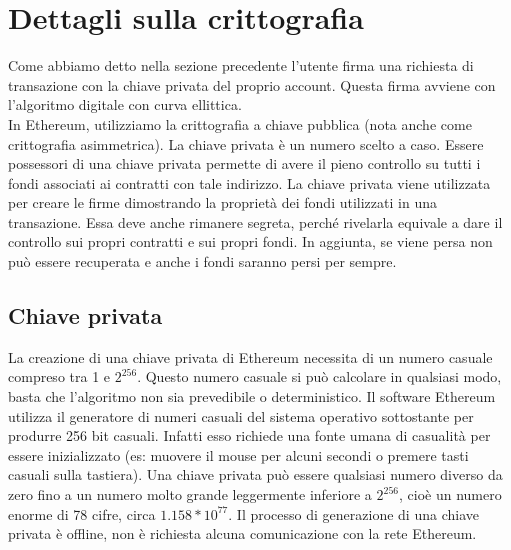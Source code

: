 \documentclass[a4paper,11pt]{report}
\begin{document}
\section{Dettagli sulla crittografia}
Come abbiamo detto nella sezione precedente l'utente firma una richiesta di transazione con la chiave privata del proprio account. Questa firma avviene con l'algoritmo digitale con curva ellittica.\\
In Ethereum, utilizziamo la crittografia a chiave pubblica (nota anche come crittografia asimmetrica).
La chiave privata è un numero scelto a caso. Essere possessori di una chiave privata permette di avere il pieno controllo su tutti i fondi associati ai contratti con tale indirizzo. 
La chiave privata viene utilizzata per creare le firme dimostrando la proprietà dei fondi utilizzati in una transazione. Essa deve anche rimanere segreta, perché rivelarla equivale a dare il controllo sui propri contratti e sui propri fondi. In aggiunta, se viene persa non può essere recuperata e anche i fondi saranno persi per sempre.\\

\subsection{Chiave privata}
La creazione di una chiave privata di Ethereum necessita di un numero casuale compreso tra 1 e $2^{256}$. Questo numero casuale si può calcolare in qualsiasi modo, basta che l'algoritmo non sia prevedibile o deterministico. Il software Ethereum utilizza il generatore di numeri casuali del sistema operativo sottostante per produrre 256 bit casuali. Infatti esso richiede una fonte umana di casualità per essere inizializzato (es: muovere il mouse per alcuni secondi o premere tasti casuali sulla tastiera).
Una chiave privata può essere qualsiasi numero diverso da zero fino a un numero molto grande leggermente inferiore a $2^{256}$, cioè un numero enorme di 78 cifre, circa $1.158*10^{77}$.
Il processo di generazione di una chiave privata è offline, non è richiesta alcuna comunicazione con la rete Ethereum. 
\end{document}
